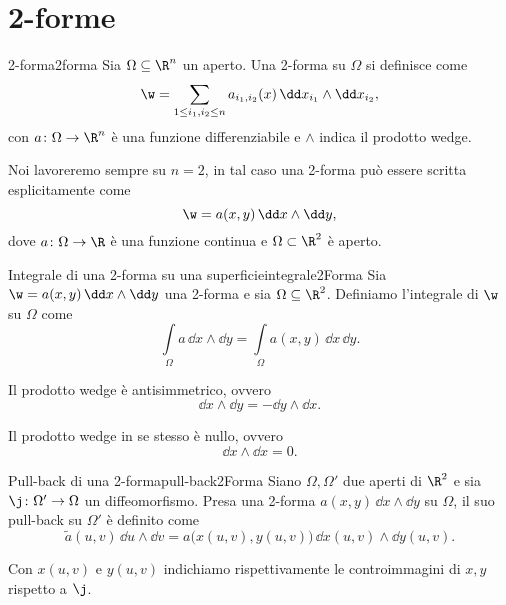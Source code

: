 \section{2-forme}

\begin{defn}{2-forma}{2forma}
	Sia \(\Omega\subseteq \R^n\) un aperto.
	Una 2-forma su \(\Omega\) si definisce come
	\[
		\w = \sum_{1\le i_1,i_2 \le n} a_{i_1,i_2}(x)\,\dd x_{i_1} \wedge \dd x_{i_2},
	\]
	con \(a\colon \Omega \to \R^n\) è una funzione differenziabile e \(\wedge\) indica il prodotto wedge.
\end{defn}

\begin{oss}
	Noi lavoreremo sempre su \(n=2\), in tal caso una 2-forma può essere scritta esplicitamente come
	\[
		\w = a(x,y)\,\dd x \wedge \dd y,
	\]
	dove \(a\colon \Omega \to \R\) è una funzione continua e \(\Omega\subset\R^2\) è aperto.
\end{oss}

\begin{defn}{Integrale di una 2-forma su una superficie}{integrale2Forma}
	Sia \(\w = a(x,y)\,\dd x \wedge \dd y\) una 2-forma e sia \(\Omega\subseteq \R^2\).
	Definiamo l'integrale di \(\w\) su \(\Omega\) come
	\[
		\int\limits_\Omega a \,\dd x \wedge \dd y = \int\limits_\Omega a(x,y)\,\dd x\,\dd y.
	\]
\end{defn}

\begin{pr}
	Il prodotto wedge è antisimmetrico, ovvero
	\[
		\dd x \wedge \dd y = - \dd y \wedge \dd x.
	\]
\end{pr}

\begin{pr}
	Il prodotto wedge in se stesso è nullo, ovvero
	\[
		\dd x \wedge \dd x = 0.
	\]
\end{pr}

\begin{defn}{Pull-back di una 2-forma}{pull-back2Forma}
	Siano \(\Omega,\Omega'\) due aperti di \(\R^2\) e sia \(\j\colon \Omega' \to \Omega\) un diffeomorfismo.
	Presa una 2-forma \(a(x,y)\,\dd x \wedge \dd y\) su \(\Omega\), il suo pull-back su \(\Omega'\) è definito come
	\[
		\tilde{a}(u,v)\,\dd u \wedge \dd v = a\big(x(u,v),y(u,v)\big)\,\dd x(u,v) \wedge \dd y(u,v).
	\]
\end{defn}

\begin{oss}
	Con \(x(u,v)\) e \(y(u,v)\) indichiamo rispettivamente le controimmagini di \(x,y\) rispetto a \(\j\).
\end{oss}

